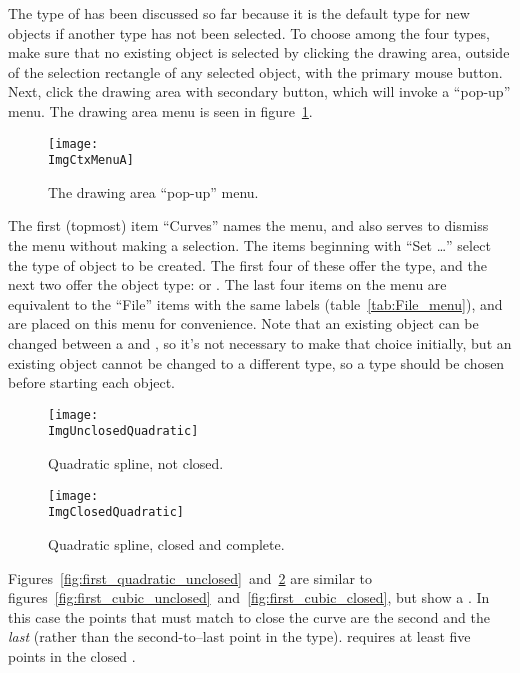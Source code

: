 		The \IXcubic{} type of \IXspline{} has been discussed so far
		because it is the default type for new objects if another
		type has not been selected. To choose among the four \IXspline{}
		types, make sure that no existing object is selected by
		clicking the drawing area, outside of the selection
		rectangle of any selected object, with the primary
		mouse button. Next, click the drawing area with secondary
		button, which will invoke a ``pop-up'' menu. The
		drawing area menu is seen in
		figure~\ref{fig:canvas_popup_menu}.

		\begin{figure}[htb!]
		\centering
		\texttt{[image: \\ImgCtxMenuA]}
		\caption{The drawing area ``pop-up'' menu.}
		\label{fig:canvas_popup_menu}
		\end{figure}

		The first (topmost)  item ``Curves''
		names the menu, and also serves to dismiss the menu
		without making a selection.
		The  items beginning with ``Set \ldots''
		select the type of object to be created. The first four
		of these offer the \IXspline{} type, and the next two offer the
		\IXpov{} object type: \IXprism{} or \IXlathe{}. The last four
		items on the menu
		are equivalent to the ``File''  items
		with the same labels
		(table~\ref{tab:File_menu}), and are placed on this menu
		for convenience. Note that an existing object can
		be changed between a \IXlathe{} and \IXprism{}, so it's not
		necessary to make that choice initially, but an existing
		object cannot be changed to a different \IXspline{} type, so
		a type should be chosen before starting each object.

		\begin{figure}[htb!]
		\centering
		\texttt{[image: \\ImgUnclosedQuadratic]}
		\caption{Quadratic spline, not closed.}
		\label{fig:first_quadratic_unclosed}
		\vspace{16pt}
		\texttt{[image: \\ImgClosedQuadratic]}
		\caption{Quadratic spline, closed and complete.}
		\label{fig:first_quadratic_closed}
		\end{figure}

		Figures~\ref{fig:first_quadratic_unclosed}~and~\ref{fig:first_quadratic_closed}
		are similar to
		figures~\ref{fig:first_cubic_unclosed}~and~\ref{fig:first_cubic_closed},
		but show a \IXquadratic{} \IXspline{}. In this case the points that
		must match to close the curve are the second and the
		\emph{last} (rather than the second-to--last
		point in the \IXcubic{} type).
		\IXpov{} requires at least five points in the closed
		\IXquadratic{} \IXspline{}.

